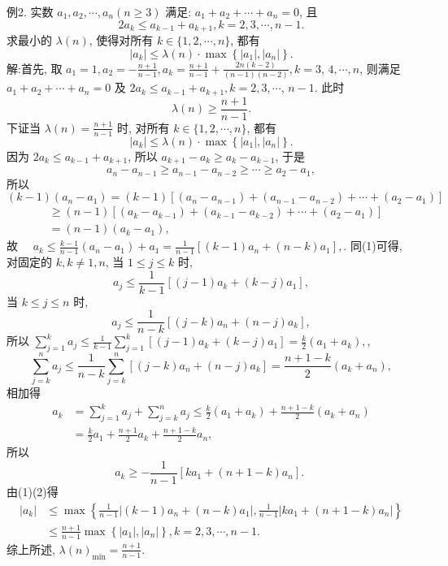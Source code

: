 例2. 实数 $a_1, a_2, \cdots, a_n(n \geqslant 3)$ 满足: $a_1+a_2+\cdots+a_n=0$, 且
$$
2 a_k \leqslant a_{k-1}+a_{k+1}, k=2,3, \cdots, n-1 .
$$
求最小的 $\lambda(n)$, 使得对所有 $k \in\{1,2, \cdots, n\}$, 都有
$$
\left|a_k\right| \leqslant \lambda(n) \cdot \max \left\{\left|a_1\right|,\left|a_n\right|\right\} .
$$
解:首先, 取 $a_1=1, a_2=-\frac{n+1}{n-1}, a_k=\frac{n+1}{n-1}+\frac{2 n(k-2)}{(n-1)(n-2)}, k=3$, $4, \cdots, n$, 则满足 $a_1+a_2+\cdots+a_n=0$ 及 $2 a_k \leqslant a_{k-1}+a_{k+1}, k=2,3, \cdots$, $n-1$. 此时
$$
\lambda(n) \geqslant \frac{n+1}{n-1} .
$$
下证当 $\lambda(n)=\frac{n+1}{n-1}$ 时, 对所有 $k \in\{1,2, \cdots, n\}$, 都有
$$
\left|a_k\right| \leqslant \lambda(n) \cdot \max \left\{\left|a_1\right|,\left|a_n\right|\right\} .
$$
因为 $2 a_k \leqslant a_{k-1}+a_{k+1}$, 所以 $a_{k+1}-a_k \geqslant a_k-a_{k-1}$, 于是
$$
a_n-a_{n-1} \geqslant a_{n-1}-a_{n-2} \geqslant \cdots \geqslant a_2-a_1,
$$
所以 $(k-1)\left(a_n-a_1\right)=(k-1)\left[\left(a_n-a_{n-1}\right)+\left(a_{n-1}-a_{n-2}\right)+\cdots+\left(a_2-a_1\right)\right]$
$$
\begin{aligned}
& \geqslant(n-1)\left[\left(a_k-a_{k-1}\right)+\left(a_{k-1}-a_{k-2}\right)+\cdots+\left(a_2-a_1\right)\right] \\
& =(n-1)\left(a_k-a_1\right),
\end{aligned}
$$
故 $\quad a_k \leqslant \frac{k-1}{n-1}\left(a_n-a_1\right)+a_1=\frac{1}{n-1}\left[(k-1) a_n+(n-k) a_1\right], \label{(1)}$.
同(1)可得, 对固定的 $k, k \neq 1, n$, 当 $1 \leqslant j \leqslant k$ 时,
$$
a_j \leqslant \frac{1}{k-1}\left[(j-1) a_k+(k-j) a_1\right],
$$
当 $k \leqslant j \leqslant n$ 时,
$$
a_j \leqslant \frac{1}{n-k}\left[(j-k) a_n+(n-j) a_k\right],
$$
所以 $\sum_{j=1}^k a_j \leqslant \frac{1}{k-1} \sum_{j=1}^k\left[(j-1) a_k+(k-j) a_1\right]=\frac{k}{2}\left(a_1+a_k\right), \label{(2)}$,
$$
\sum_{j=k}^n a_j \leqslant \frac{1}{n-k} \sum_{j=k}^n\left[(j-k) a_n+(n-j) a_k\right]=\frac{n+1-k}{2}\left(a_k+a_n\right),
$$
相加得
$$
\begin{aligned}
a_k & =\sum_{j=1}^k a_j+\sum_{j=k}^n a_j \leqslant \frac{k}{2}\left(a_1+a_k\right)+\frac{n+1-k}{2}\left(a_k+a_n\right) \\
& =\frac{k}{2} a_1+\frac{n+1}{2} a_k+\frac{n+1-k}{2} a_n,
\end{aligned}
$$
所以
$$
a_k \geqslant-\frac{1}{n-1}\left[k a_1+(n+1-k) a_n\right] \text {. }
$$
由(1)(2)得
$$
\begin{aligned}
\left|a_k\right| & \leqslant \max \left\{\frac{1}{n-1}\left|(k-1) a_n+(n-k) a_1\right|, \frac{1}{n-1}\left|k a_1+(n+1-k) a_n\right|\right\} \\
& \leqslant \frac{n+1}{n-1} \max \left\{\left|a_1\right|,\left|a_n\right|\right\}, k=2,3, \cdots, n-1 .
\end{aligned}
$$
综上所述, $\lambda(n)_{\min }=\frac{n+1}{n-1}$.



